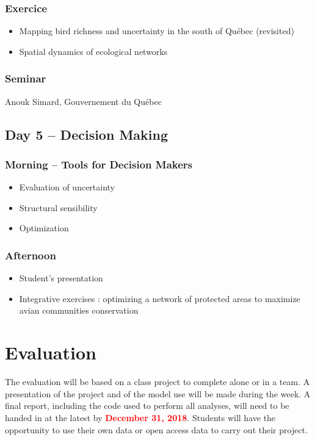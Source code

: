 \documentclass[12]{article}
\begin{document}
  \subsubsection*{Exercice}
  \begin{itemize}
    \item Mapping bird richness and uncertainty in the south of Québec
    (revisited)
    \item Spatial dynamics of ecological networks
  \end{itemize}

  \subsubsection*{Seminar}
  Anouk Simard, Gouvernement du Québec

  \subsection*{Day 5 -- Decision Making}
  \subsubsection*{Morning -- Tools for Decision Makers}
  \begin{itemize}
    \item Evaluation of uncertainty
    \item Structural sensibility
    \item Optimization
  \end{itemize}
  \subsubsection*{Afternoon}
  \begin{itemize}
    \item Student's presentation
    \item Integrative exercises : optimizing a network of protected areas to
    maximize avian communities conservation
  \end{itemize}

	\section*{Evaluation}

  The evaluation will be based on a class project to complete alone or in a
  team. A presentation of the project and of the model use will be made during
  the week. A final report, including the code used to perform all analyses,
  will need to be handed in at the latest by \textbf{\textcolor{red}{December
  31, 2018}}. Students will have the opportunity to use their own data or open
  access data to carry out their project.
\end{document}
